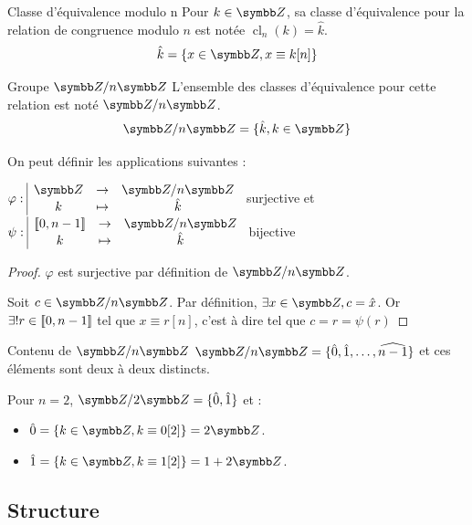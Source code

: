 \begin{definition}{Classe d'équivalence modulo n}{}
    Pour $k \in \Z$, sa classe d'équivalence pour la relation de congruence modulo $n$ 
    est notée $\operatorname{cl}_n(k) = \hat k$. 
    \[\hat k = \{x \in \Z, x \equiv k [n]\}\]
\end{definition}

\begin{definition}{Groupe $\Z/n\Z$}{}
    L'ensemble des classes d'équivalence pour cette relation est noté $\Z/n\Z$.
    \[\Z/n\Z = \{\hat k, k \in \Z\}\]
\end{definition}

\begin{theoreme}{}{}
    On peut définir les applications suivantes : 
    \begin{center}
        $\fonction{\varphi}{\Z}{\Z/n\Z}{k}{\hat k}$ surjective et
        $\fonction{\psi}{\ninter{0}{n-1}}{\Z/n\Z}{k}{\hat k}$ bijective
    \end{center}
\end{theoreme}


\begin{proof}
    $\varphi$ est surjective par définition de $\Z/n\Z$.

    Soit $c \in \Z/n\Z$. Par définition, $\exists x \in \Z, c = \hat x$. Or $\exists ! r \in [\![0, n-1]\!]$ 
    tel que $x \equiv r [n]$, c'est à dire tel que $c = \hat r = \psi(r)$
\end{proof}

\begin{corollaire}{Contenu de $\Z/n\Z$}{}
    $\Z/n\Z = \{\hat 0, \hat 1, \ldots, \widehat{n-1}\}$ et ces éléments sont 
    deux à deux distincts.
\end{corollaire}

\begin{exemple}
    Pour $n = 2$, $\Z/2\Z = \{\hat 0, \hat 1\}$ et :
    \begin{itemize}
        \item $\hat 0 = \{k \in \Z, k \equiv 0 [2]\} = 2 \Z$.
        \item $\hat 1 = \{k \in \Z, k \equiv 1 [2]\} = 1 + 2 \Z$.
    \end{itemize}
\end{exemple}

\subsection{Structure}

